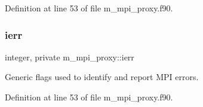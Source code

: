 Definition at line 53 of file m\+\_\+mpi\+\_\+proxy.\+f90.

\mbox{\label{namespacem__mpi__proxy_a306ba163b09cfc692125f2c0ba82ef8c}} 
\subsubsection{\texorpdfstring{ierr}{ierr}}
{\footnotesize\ttfamily integer, private m\+\_\+mpi\+\_\+proxy\+::ierr\hspace{0.3cm}{\ttfamily [private]}}



Generic flags used to identify and report M\+PI errors. 



Definition at line 53 of file m\+\_\+mpi\+\_\+proxy.\+f90.

